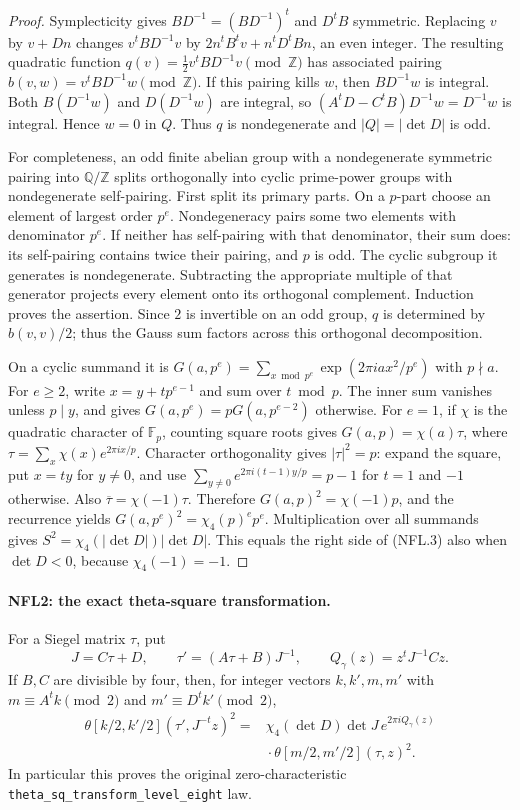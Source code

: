 \begin{proof}
Symplecticity gives $BD^{-1}=(BD^{-1})^t$ and $D^tB$ symmetric.
Replacing $v$ by $v+Dn$ changes $v^tBD^{-1}v$ by
$2n^tB^tv+n^tD^tBn$, an even integer.  The resulting quadratic
function $q(v)=\tfrac12v^tBD^{-1}v\pmod{\mathbb Z}$ has associated
pairing $b(v,w)=v^tBD^{-1}w\pmod{\mathbb Z}$.
If this pairing kills $w$, then $BD^{-1}w$ is integral.  Both
$B(D^{-1}w)$ and $D(D^{-1}w)$ are integral, so
$(A^tD-C^tB)D^{-1}w=D^{-1}w$ is integral.  Hence $w=0$ in $Q$.
Thus $q$ is nondegenerate and $|Q|=|\det D|$ is odd.

For completeness, an odd finite abelian group with a nondegenerate
symmetric pairing into $\mathbb Q/\mathbb Z$ splits orthogonally
into cyclic prime-power groups with nondegenerate self-pairing.
First split its primary parts.  On a $p$-part choose an element of
largest order $p^e$.  Nondegeneracy pairs some two elements with
denominator $p^e$.  If neither has self-pairing with that denominator,
their sum does: its self-pairing contains twice their pairing, and
$p$ is odd.  The cyclic subgroup it generates is nondegenerate.
Subtracting the appropriate multiple of that generator projects
every element onto its orthogonal complement.  Induction proves
the assertion.  Since $2$ is invertible on an odd group, $q$ is
determined by $b(v,v)/2$; thus the Gauss sum factors across this
orthogonal decomposition.

On a cyclic summand it is
$G(a,p^e)=\sum_{x\bmod p^e}\exp(2\pi i ax^2/p^e)$ with $p\nmid a$.
For $e\ge2$, write $x=y+tp^{e-1}$ and sum over $t\bmod p$.
The inner sum vanishes unless $p\mid y$, and gives
$G(a,p^e)=pG(a,p^{e-2})$ otherwise.  For $e=1$, if $\chi$ is the
quadratic character of $\mathbb F_p$, counting square roots gives
$G(a,p)=\chi(a)\tau$, where
$\tau=\sum_x\chi(x)e^{2\pi ix/p}$.
Character orthogonality gives $|\tau|^2=p$: expand the square,
put $x=ty$ for $y\ne0$, and use
$\sum_{y\ne0}e^{2\pi i(t-1)y/p}=p-1$ for $t=1$ and $-1$ otherwise.
Also $\overline\tau=\chi(-1)\tau$.  Therefore
$G(a,p)^2=\chi(-1)p$, and the recurrence yields
$G(a,p^e)^2=\chi_4(p)^e p^e$.
Multiplication over all summands gives
$S^2=\chi_4(|\det D|)|\det D|$.
This equals the right side of (NFL.3) also when $\det D<0$,
because $\chi_4(-1)=-1$.
\end{proof}

\paragraph{NFL2: the exact theta-square transformation.}
\label{claim:NFL2}
For a Siegel matrix $\tau$, put
\[
 J=C\tau+D,\qquad \tau'=(A\tau+B)J^{-1},
 \qquad Q_\gamma(z)=z^tJ^{-1}Cz.
\]
If $B,C$ are divisible by four, then, for integer vectors $k,k',m,m'$
with $m\equiv A^tk\pmod2$ and $m'\equiv D^tk'\pmod2$,
\[
 \begin{split}
 \theta[k/2,k'/2](\tau',J^{-t}z)^2
   ={}&\chi_4(\det D)\det J\,e^{2\pi iQ_\gamma(z)}\\
     &{}\cdot\theta[m/2,m'/2](\tau,z)^2.
 \end{split}
 \tag{NFL.4}
\]
In particular this proves the original zero-characteristic
\texttt{theta\_sq\_transform\_level\_eight} law.

